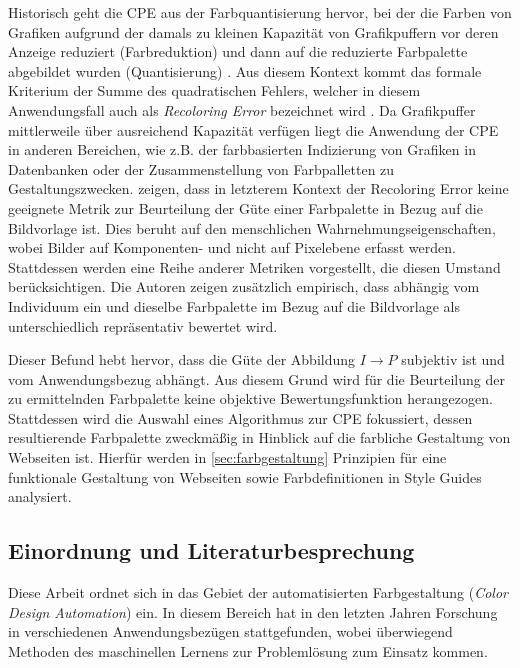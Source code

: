 Historisch geht die CPE aus der Farbquantisierung hervor, bei der die Farben von Grafiken aufgrund der damals zu kleinen Kapazität von Grafikpuffern vor deren Anzeige reduziert (Farbreduktion) und dann auf die reduzierte Farbpalette abgebildet wurden (Quantisierung) \citep{variance}. Aus diesem Kontext kommt das formale Kriterium der Summe des quadratischen Fehlers, welcher in diesem Anwendungsfall auch als \emph{Recoloring Error} bezeichnet wird \citep{colorthemes}. Da Grafikpuffer mittlerweile über ausreichend Kapazität verfügen liegt die Anwendung der CPE in anderen Bereichen, wie z.B. der farbbasierten Indizierung von Grafiken in Datenbanken oder der Zusammenstellung von Farbpalletten zu Gestaltungszwecken. \citet{colorthemes} zeigen, dass in letzterem Kontext der Recoloring Error keine geeignete Metrik zur Beurteilung der Güte einer Farbpalette in Bezug auf die Bildvorlage ist. Dies beruht auf den menschlichen Wahrnehmungseigenschaften, wobei Bilder auf Komponenten- und nicht auf Pixelebene erfasst werden. Stattdessen werden eine Reihe anderer Metriken vorgestellt, die diesen Umstand berücksichtigen. Die Autoren zeigen zusätzlich empirisch, dass abhängig vom Individuum ein und dieselbe Farbpalette im Bezug auf die Bildvorlage als unterschiedlich repräsentativ bewertet wird.

Dieser Befund hebt hervor, dass die Güte der Abbildung $I \to P$ subjektiv ist und vom Anwendungsbezug abhängt. Aus diesem Grund wird für die Beurteilung der zu ermittelnden Farbpalette keine objektive Bewertungsfunktion herangezogen. Stattdessen wird die Auswahl eines Algorithmus zur CPE fokussiert, dessen resultierende Farbpalette zweckmäßig in Hinblick auf die farbliche Gestaltung von Webseiten ist. Hierfür werden in \autoref{sec:farbgestaltung} Prinzipien für eine funktionale Gestaltung von Webseiten sowie Farbdefinitionen in Style Guides analysiert.

\subsection{Einordnung und Literaturbesprechung}
\label{sec:literatur}

Diese Arbeit ordnet sich in das Gebiet der automatisierten Farbgestaltung (\emph{Color Design Automation}) ein. In diesem Bereich hat in den letzten Jahren Forschung in verschiedenen Anwendungsbezügen stattgefunden, wobei überwiegend Methoden des maschinellen Lernens zur Problemlösung zum Einsatz kommen.

